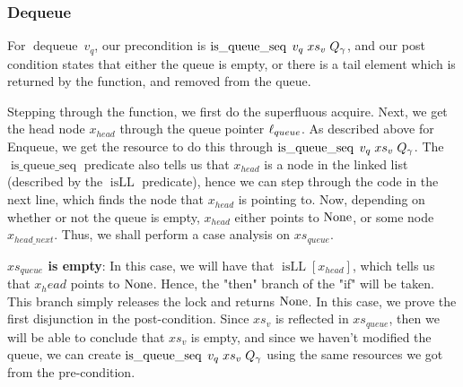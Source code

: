 \documentclass[twoside,11pt,openright]{report}
\newcommand{\dequeue}{\operatorname{dequeue}}
\newcommand{\isqueueseq}{\operatorname{is\_queue\_seq}}
\newcommand{\isLL}{\operatorname{isLL}}
\begin{document}
\subsubsection{Dequeue}

For $\dequeue\ v_q$, our precondition is $\isqueueseq \; v_q \; xs_v \; Q_\gname$, and our post condition states that either the queue is empty, or there is a tail element which is returned by the function, and removed from the queue.

Stepping through the function, we first do the superfluous acquire. Next, we get the head node $x_{head}$ through the queue pointer $\ell_{queue}$. As described above for Enqueue, we get the resource to do this through $\isqueueseq \; v_q \; xs_v \; Q_\gname$. The $\isqueueseq$ predicate also tells us that $x_{head}$ is a node in the linked list (described by the $\isLL$ predicate), hence we can step through the code in the next line, which finds the node that $x_{head}$ is pointing to. Now, depending on whether or not the queue is empty, $x_{head}$ either points to $\operatorname{None}$, or some node $x_{head\_next}$. Thus, we shall perform a case analysis on $xs_{queue}$.

\textbf{$xs_{queue}$ is empty}: In this case, we will have that $\isLL [x_{head}]$, which tells us that $x_head$ points to $\operatorname{None}$. Hence, the "then" branch of the "if" will be taken. This branch simply releases the lock and returns $\operatorname{None}$. In this case, we prove the first disjunction in the post-condition. Since $xs_v$ is reflected in $xs_{queue}$, then we will be able to conclude that $xs_v$ is empty, and since we haven't modified the queue, we can create $\isqueueseq \; v_q \; xs_v \; Q_\gname$ using the same resources we got from the pre-condition.
\end{document}
